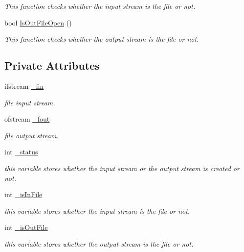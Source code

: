 \begin{CompactItemize}
\begin{CompactList}\small\item\em This function checks whether the input stream is the file or not. \item\end{CompactList}\item 
bool \hyperlink{classkmaOrange_1_1StrStream_d48ff9ac58ada57fbfded35c0e50ee6e}{IsOutFileOpen} ()
\begin{CompactList}\small\item\em This function checks whether the output stream is the file or not. \item\end{CompactList}\end{CompactItemize}
\subsection*{Private Attributes}
\begin{CompactItemize}
\item 
ifstream \hyperlink{classkmaOrange_1_1StrStream_a24688ba32500f2f906c7f89eca4e667}{\_\-fin}
\begin{CompactList}\small\item\em file input stream. \item\end{CompactList}\item 
ofstream \hyperlink{classkmaOrange_1_1StrStream_7d971213b6446bbb7fec046702959edb}{\_\-fout}
\begin{CompactList}\small\item\em file output stream. \item\end{CompactList}\item 
int \hyperlink{classkmaOrange_1_1StrStream_4e12ef11501334df836783f1f5328436}{\_\-status}
\begin{CompactList}\small\item\em this variable stores whether the input stream or the output stream is created or not. \item\end{CompactList}\item 
int \hyperlink{classkmaOrange_1_1StrStream_47f0d0b245d807cefd3e6755ac27488f}{\_\-isInFile}
\begin{CompactList}\small\item\em this variable stores whether the input stream is the file or not. \item\end{CompactList}\item 
int \hyperlink{classkmaOrange_1_1StrStream_7cf62f7fb6c32f88966896ed486980a0}{\_\-isOutFile}
\begin{CompactList}\small\item\em this variable stores whether the output stream is the file or not. \item\end{CompactList}\end{CompactItemize}

